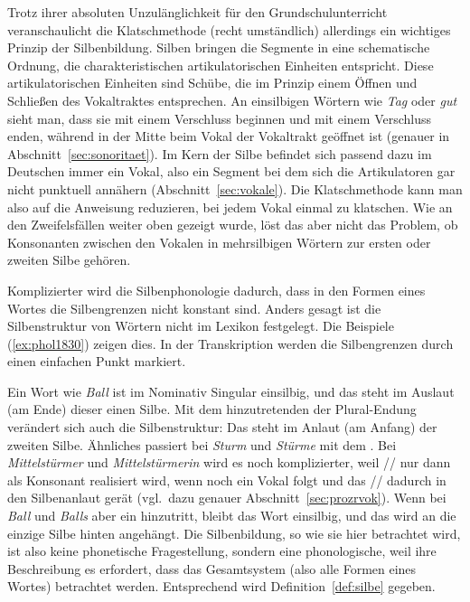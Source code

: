 Trotz ihrer absoluten Unzulänglichkeit für den Grundschulunterricht veranschaulicht die Klatschmethode (recht umständlich) allerdings ein wichtiges Prinzip der Silbenbildung.
Silben bringen die Segmente in eine schematische Ordnung, die charakteristischen artikulatorischen Einheiten entspricht.
Diese artikulatorischen Einheiten sind Schübe, die im Prinzip einem Öffnen und Schließen des Vokaltraktes entsprechen.
An einsilbigen Wörtern wie \textit{Tag} \textipa{[ta:k]} oder \textit{gut} \textipa{[gU:t]} sieht man, dass sie mit einem Verschluss beginnen und mit einem Verschluss enden, während in der Mitte beim Vokal der Vokaltrakt geöffnet ist (genauer in Abschnitt~\ref{sec:sonoritaet}).
Im Kern der Silbe befindet sich passend dazu im Deutschen immer ein Vokal, also ein Segment bei dem sich die Artikulatoren gar nicht punktuell annähern (Abschnitt~\ref{sec:vokale}).
Die Klatschmethode kann man also auf die Anweisung reduzieren, bei jedem Vokal einmal zu klatschen.
Wie an den Zweifelsfällen weiter oben gezeigt wurde, löst das aber nicht das Problem, ob Konsonanten zwischen den Vokalen in mehrsilbigen Wörtern zur ersten oder zweiten Silbe gehören.

Komplizierter wird die Silbenphonologie dadurch, dass in den Formen eines Wortes die Silbengrenzen nicht konstant sind.
Anders gesagt ist die Silbenstruktur von Wörtern nicht im Lexikon festgelegt.
Die Beispiele (\ref{ex:phol1830}) zeigen dies.
In der Transkription werden die Silbengrenzen durch einen einfachen Punkt markiert.

\begin{exe}
  \ex\label{ex:phol1830}
  \begin{xlist}
  \end{xlist}
\end{exe}

Ein Wort wie \textit{Ball} ist im Nominativ Singular einsilbig, und das \textipa{[l]} steht im Auslaut (am Ende) dieser einen Silbe.
Mit dem hinzutretenden \textipa{[@]} der Plural-Endung verändert sich auch die Silbenstruktur:
Das \textipa{[l]} steht im Anlaut (am Anfang) der zweiten Silbe.
Ähnliches passiert bei \textit{Sturm} und \textit{Stürme} mit dem \textipa{[m]}.
Bei \textit{Mittelstürmer} \textipa{[mI.t@l.St\t{Y@}.m5]} und \textit{Mittelstürmerin} \textipa{[mI.t@l.St\t{Y@}.m@.KIn]} wird es noch komplizierter, weil // nur dann als Konsonant \textipa{[K]} realisiert wird, wenn noch ein Vokal folgt und das // dadurch in den Silbenanlaut gerät (vgl.\ dazu genauer Abschnitt~\ref{sec:prozrvok}).
Wenn bei \textit{Ball} und \textit{Balls} aber ein \textipa{[s]} hinzutritt, bleibt das Wort einsilbig, und das \textipa{[s]} wird an die einzige Silbe hinten angehängt.
Die Silbenbildung, so wie sie hier betrachtet wird, ist also keine phonetische Fragestellung, sondern eine phonologische, weil ihre Beschreibung es erfordert, dass das Gesamtsystem (also \zB alle Formen eines Wortes) betrachtet werden.
Entsprechend wird Definition~\ref{def:silbe} gegeben.

